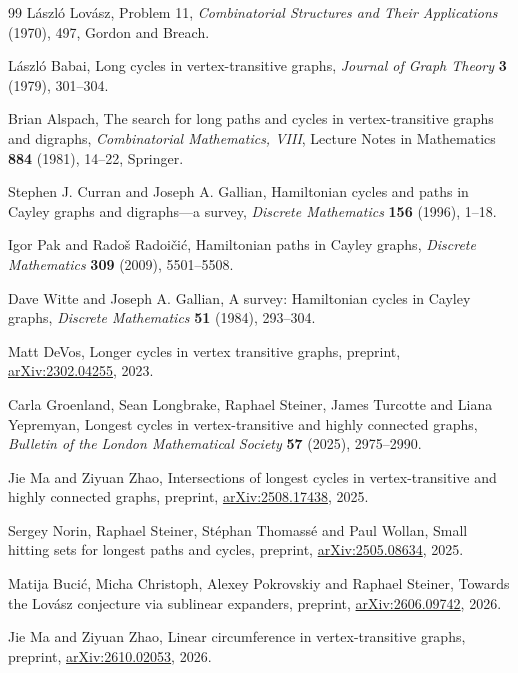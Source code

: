 \documentclass[11pt,a4paper,reqno]{amsart}
\theoremstyle{definition}
\theoremstyle{remark}
\numberwithin{equation}{section}
\begin{document}
\begin{thebibliography}{99}
L\'aszl\'o Lov\'asz, Problem 11, \emph{Combinatorial Structures and Their Applications} (1970), 497, Gordon and Breach.

L\'aszl\'o Babai, Long cycles in vertex-transitive graphs, \emph{Journal of Graph Theory} \textbf{3} (1979), 301--304.

Brian Alspach, The search for long paths and cycles in vertex-transitive graphs and digraphs, \emph{Combinatorial Mathematics, VIII}, Lecture Notes in Mathematics \textbf{884} (1981), 14--22, Springer.

Stephen J. Curran and Joseph A. Gallian, Hamiltonian cycles and paths in Cayley graphs and digraphs---a survey, \emph{Discrete Mathematics} \textbf{156} (1996), 1--18.

Igor Pak and Rado\v{s} Radoi\v{c}i\'c, Hamiltonian paths in Cayley graphs, \emph{Discrete Mathematics} \textbf{309} (2009), 5501--5508.

Dave Witte and Joseph A. Gallian, A survey: Hamiltonian cycles in Cayley graphs, \emph{Discrete Mathematics} \textbf{51} (1984), 293--304.

Matt DeVos, Longer cycles in vertex transitive graphs, preprint, \href{https://arxiv.org/abs/2302.04255}{arXiv:2302.04255}, 2023.

Carla Groenland, Sean Longbrake, Raphael Steiner, James Turcotte and Liana Yepremyan, Longest cycles in vertex-transitive and highly connected graphs, \emph{Bulletin of the London Mathematical Society} \textbf{57} (2025), 2975--2990.

Jie Ma and Ziyuan Zhao, Intersections of longest cycles in vertex-transitive and highly connected graphs, preprint, \href{https://arxiv.org/abs/2508.17438}{arXiv:2508.17438}, 2025.

Sergey Norin, Raphael Steiner, St\'ephan Thomass\'e and Paul Wollan, Small hitting sets for longest paths and cycles, preprint, \href{https://arxiv.org/abs/2505.08634}{arXiv:2505.08634}, 2025.

Matija Buci\'c, Micha Christoph, Alexey Pokrovskiy and Raphael Steiner, Towards the Lov\'asz conjecture via sublinear expanders, preprint, \href{https://arxiv.org/abs/2606.09742}{arXiv:2606.09742}, 2026.

Jie Ma and Ziyuan Zhao, Linear circumference in vertex-transitive graphs, preprint, \href{https://arxiv.org/abs/2610.02053}{arXiv:2610.02053}, 2026.


\end{thebibliography}
\end{document}
